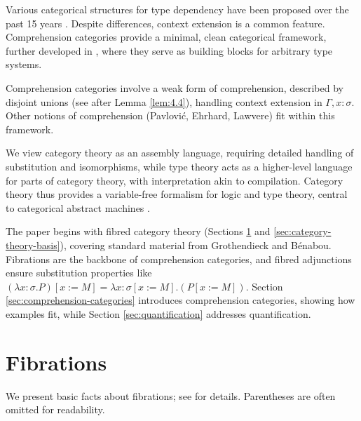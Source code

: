 \documentclass{article}
\theoremstyle{plain}
\theoremstyle{remark}
\begin{document}
Various categorical structures for type dependency have been proposed over the past 15 years \cite{Cartmell1978, Seely1984, Taylor1986, Lamarche1988, HylandPitts1989, Moggi1991, Pavlovic1990}. Despite differences, context extension is a common feature. Comprehension categories provide a minimal, clean categorical framework, further developed in \cite{Jacobs1991, JacobsMoggiStreicher1991}, where they serve as building blocks for arbitrary type systems.

Comprehension categories involve a weak form of comprehension, described by disjoint unions (see after Lemma \ref{lem:4.4}), handling context extension in $\Gamma, x : \sigma$. Other notions of comprehension (Pavlović, Ehrhard, Lawvere) fit within this framework.

We view category theory as an assembly language, requiring detailed handling of substitution and isomorphisms, while type theory acts as a higher-level language for parts of category theory, with interpretation akin to compilation. Category theory thus provides a variable-free formalism for logic and type theory, central to categorical abstract machines \cite{Curien1986, Curien1989}.

The paper begins with fibred category theory (Sections \ref{sec:fibrations} and \ref{sec:category-theory-basis}), covering standard material from Grothendieck and Bénabou. Fibrations are the backbone of comprehension categories, and fibred adjunctions ensure substitution properties like $(\lambda x : \sigma . P)[x := M] = \lambda x : \sigma[x := M] . (P[x := M])$. Section \ref{sec:comprehension-categories} introduces comprehension categories, showing how examples fit, while Section \ref{sec:quantification} addresses quantification.

\newpage
\section{Fibrations}
\label{sec:fibrations}

We present basic facts about fibrations; see \cite{Benabou1985, Giraud1971, Gray1966, Grothendieck1971} for details. Parentheses are often omitted for readability.
\end{document}
